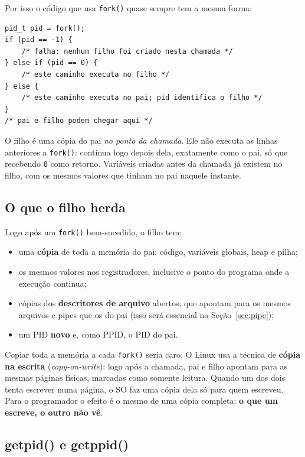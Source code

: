 \documentclass[11pt,a4paper]{article}
\newcommand{\cmd}[1]{\texttt{#1}}
\begin{document}
Por isso o código que usa \cmd{fork()} quase sempre tem a mesma forma:

\begin{lstlisting}[style=codigo]
pid_t pid = fork();
if (pid == -1) {
    /* falha: nenhum filho foi criado nesta chamada */
} else if (pid == 0) {
    /* este caminho executa no filho */
} else {
    /* este caminho executa no pai; pid identifica o filho */
}
/* pai e filho podem chegar aqui */
\end{lstlisting}

\begin{alerta}
O filho é uma cópia do pai \emph{no ponto da chamada}. Ele não executa as linhas anteriores a \cmd{fork()}: continua logo depois dela, exatamente como o pai, só que recebendo \cmd{0} como retorno. Variáveis criadas antes da chamada já existem no filho, com os mesmos valores que tinham no pai naquele instante.
\end{alerta}

\subsection{O que o filho herda}

Logo após um \cmd{fork()} bem-sucedido, o filho tem:

\begin{itemize}
    \item uma \textbf{cópia} de toda a memória do pai: código, variáveis globais, heap e pilha;
    \item os mesmos valores nos registradores, inclusive o ponto do programa onde a execução continua;
    \item cópias dos \textbf{descritores de arquivo} abertos, que apontam para os mesmos arquivos e pipes que os do pai (isso será essencial na Seção~\ref{sec:pipe});
    \item um PID \textbf{novo} e, como PPID, o PID do pai.
\end{itemize}

Copiar toda a memória a cada \cmd{fork()} seria caro. O Linux usa a técnica de \textbf{cópia na escrita} (\emph{copy-on-write}): logo após a chamada, pai e filho apontam para as mesmas páginas físicas, marcadas como somente leitura. Quando um dos dois tenta escrever numa página, o SO faz uma cópia dela só para quem escreveu. Para o programador o efeito é o mesmo de uma cópia completa: \textbf{o que um escreve, o outro não vê}.

\subsection{getpid() e getppid()}
\end{document}
